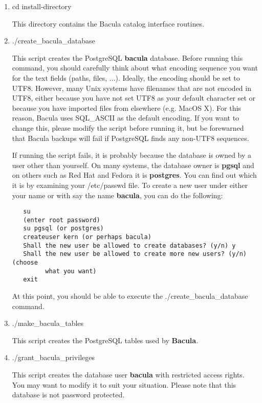 \begin{enumerate}
\item cd \lt{}install-directory\gt{}

   This directory contains the Bacula catalog  interface routines.  

\item ./create\_bacula\_database

   This script creates the PostgreSQL {\bf bacula} database.  
   Before running this command, you should carefully think about
   what encoding sequence you want for the text fields (paths, files, ...).
   Ideally, the encoding should be set to UTF8. However, many Unix systems
   have filenames that are not encoded in UTF8, either because you have
   not set UTF8 as your default character set or because you have imported
   files from elsewhere (e.g. MacOS X).  For this reason, Bacula uses
   SQL\_ASCII as the default encoding.  If you want to change this,
   please modify the script before running it, but be forewarned that
   Bacula backups will fail if PostgreSQL finds any non-UTF8 sequences.

   If running the script fails, it is probably because the database is
   owned by a user other than yourself.  On many systems, the database
   owner is {\bf pgsql} and on others such as Red Hat and Fedora it is {\bf
   postgres}.  You can find out which it is by examining your /etc/passwd
   file.  To create a new user under either your name or with say the name
   {\bf bacula}, you can do the following:

\begin{verbatim}
   su
   (enter root password)
   su pgsql (or postgres)
   createuser kern (or perhaps bacula)
   Shall the new user be allowed to create databases? (y/n) y
   Shall the new user be allowed to create more new users? (y/n) (choose
         what you want)
   exit
\end{verbatim}
    
    At this point, you should be able to execute the
    ./create\_bacula\_database command.

\item ./make\_bacula\_tables

   This script creates the PostgreSQL tables used by {\bf Bacula}.  
\item ./grant\_bacula\_privileges

   This script creates the database user {\bf bacula}  with restricted access
rights. You may  want to modify it to suit your situation. Please note that 
this database is not password protected.  

\end{enumerate}

